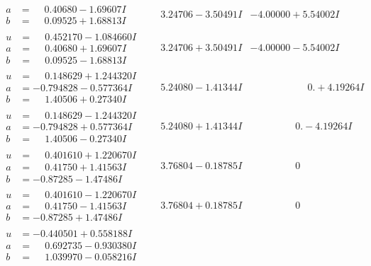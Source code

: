 \documentclass[1p]{elsarticle_modified}
\theoremstyle{definition}
\begin{document}
$$\begin{array}{c|c|c}
\begin{aligned}
a &= \phantom{-}0.40680 - 1.69607 I \\
b &= \phantom{-}0.09525 + 1.68813 I\end{aligned}
 & \phantom{-}3.24706 - 3.50491 I & -4.00000 + 5.54002 I \\ \hline\begin{aligned}
u &= \phantom{-}0.452170 - 1.084660 I \\
a &= \phantom{-}0.40680 + 1.69607 I \\
b &= \phantom{-}0.09525 - 1.68813 I\end{aligned}
 & \phantom{-}3.24706 + 3.50491 I & -4.00000 - 5.54002 I \\ \hline\begin{aligned}
u &= \phantom{-}0.148629 + 1.244320 I \\
a &= -0.794828 - 0.577364 I \\
b &= \phantom{-}1.40506 + 0.27340 I\end{aligned}
 & \phantom{-}5.24080 - 1.41344 I & \phantom{-0.000000 -}0. + 4.19264 I \\ \hline\begin{aligned}
u &= \phantom{-}0.148629 - 1.244320 I \\
a &= -0.794828 + 0.577364 I \\
b &= \phantom{-}1.40506 - 0.27340 I\end{aligned}
 & \phantom{-}5.24080 + 1.41344 I & \phantom{-0.000000 } 0. - 4.19264 I \\ \hline\begin{aligned}
u &= \phantom{-}0.401610 + 1.220670 I \\
a &= \phantom{-}0.41750 + 1.41563 I \\
b &= -0.87285 - 1.47486 I\end{aligned}
 & \phantom{-}3.76804 - 0.18785 I & \phantom{-0.000000 } 0 \\ \hline\begin{aligned}
u &= \phantom{-}0.401610 - 1.220670 I \\
a &= \phantom{-}0.41750 - 1.41563 I \\
b &= -0.87285 + 1.47486 I\end{aligned}
 & \phantom{-}3.76804 + 0.18785 I & \phantom{-0.000000 } 0 \\ \hline\begin{aligned}
u &= -0.440501 + 0.558188 I \\
a &= \phantom{-}0.692735 - 0.930380 I \\
b &= \phantom{-}1.039970 - 0.058216 I\end{aligned}

\end{array}$$
\end{document}
